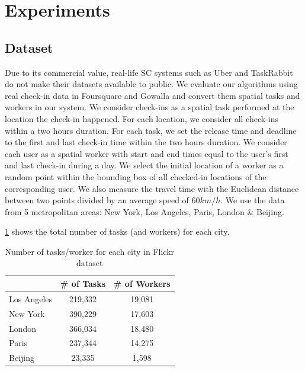 \section{Experiments}
\label{sec:experiments}


\subsection{Dataset}
\label{subsec:dataset}
Due to its commercial value, real-life SC systems such as Uber and TaskRabbit do not make their datasets available to public. We evaluate our algorithms using real check-in data in Foursquare and Gowalla and convert them spatial tasks and workers in our system. We consider check-ins as a spatial task performed at the location the check-in happened. For each location, we consider all check-ins within a two hours duration. For each task, we set the release time and deadline to the first and last check-in time within the two hours duration. We consider each user as a spatial worker with start and end times equal to the user's first and last check-in during a day. We select the initial location of a worker as a random point within the bounding box of all checked-in locations of the corresponding user. We also measure the travel time with the Euclidean distance between two points divided by an average speed of $60 km/h$. We use the data from 5 metropolitan areas: New York, Los Angeles, Paris, London \& Beijing. 

\cref{tab:flickr_stats} shows the total number of tasks (and workers) for each city.

\begin{table}[h]
\begin{center}
\begin{tabular}{| l || c | c |} \hline
			&	\# of Tasks	&	\# of Workers	\\ \hline
Los Angeles	&	219,332		&		19,081		\\ \hline
New York	&	390,229		&		17,603		\\ \hline
London		& 	366,034		&		18,480		\\ \hline
Paris		&	237,344		&		14,275		\\ \hline
Beijing		&	23,335		&		1,598		\\ \hline
\end{tabular}
\vspace{-0.1in}
\caption{\small{Number of tasks/worker for each city in Flickr dataset}}
\label{tab:flickr_stats}
\end{center}
\end{table}

